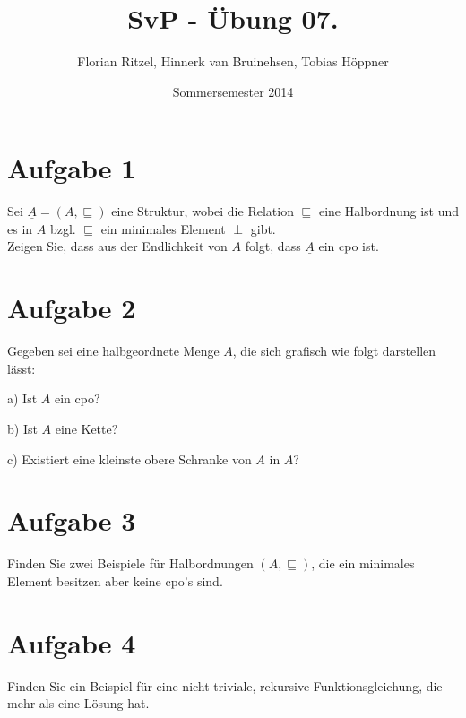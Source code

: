 \documentclass[ngerman,a4paper]{report}
\author{Florian Ritzel, Hinnerk van Bruinehsen, Tobias Höppner}
\title{SvP - Übung 07. }
\date{Sommersemester 2014}
\renewcommand{\maketitle}{}
\begin{document}
\maketitle
\section*{Aufgabe 1}
Sei $\underline{A} = (A,\sqsubseteq)$ eine Struktur, wobei die Relation $\sqsubseteq$ eine Halbordnung ist und es in $A$ bzgl. $\sqsubseteq$ ein minimales Element $\perp$ gibt.\\
Zeigen Sie, dass aus der Endlichkeit von $A$ folgt, dass $\underline{A}$ ein cpo ist.
\section*{Aufgabe 2}
Gegeben sei eine halbgeordnete Menge $A$, die sich grafisch wie folgt darstellen lässt:\\
\begin{figure}[h]
\centering
{}

\end{figure}
\begin{compactitem}
\item[a)] Ist $A$ ein cpo?
\item[b)] Ist $A$ eine Kette?
\item[c)] Existiert eine kleinste obere Schranke von $A$ in $A$?
\end{compactitem}
\section*{Aufgabe 3}
Finden Sie zwei Beispiele für Halbordnungen $(A,\sqsubseteq)$, die ein minimales Element besitzen aber keine cpo's sind.
\section*{Aufgabe 4}
Finden Sie ein Beispiel für eine nicht triviale, rekursive Funktionsgleichung, die mehr als eine Lösung hat.
\end{document}
